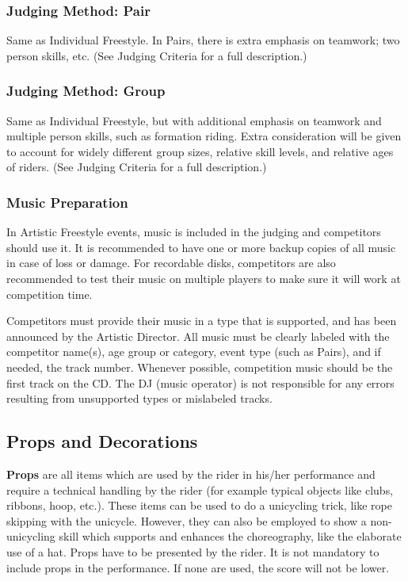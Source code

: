 \subsubsection{Judging Method: Pair}
Same as Individual Freestyle.
In Pairs, there is extra emphasis on teamwork; two person skills, etc.
(See Judging Criteria for a full description.)

\subsubsection{Judging Method: Group}
Same as Individual Freestyle, but with additional emphasis on teamwork and multiple person skills, such as formation riding.
Extra consideration will be given to account for widely different group sizes, relative skill levels, and relative ages of riders.
(See Judging Criteria for a full description.)

\subsubsection{Music Preparation}
\label{sec:freestyle_music}
In Artistic Freestyle events, music is included in the judging and competitors should use it.
It is recommended to have one or more backup copies of all music in case of loss or damage.
For recordable disks, competitors are also recommended to test their music on multiple players to make sure it will work at competition time.

Competitors must provide their music in a type that is supported, and has been announced by the Artistic Director.
All music must be clearly labeled with the competitor name(s), age group or category, event type (such as Pairs), and if needed, the track number.
Whenever possible, competition music should be the first track on the CD.
The DJ (music operator) is not responsible for any errors resulting from unsupported types or mislabeled tracks.

\subsection{Props and Decorations \label{subsec:freestyle_freestyle-rules_individual-freestyle-overview_props-and-decorations}}

\textbf{Props} are all items which are used by the rider in his/her performance and require a technical handling by the rider (for example typical objects like clubs, ribbons, hoop, etc.).
These items can be used to do a unicycling trick, like rope skipping with the unicycle.
However, they can also be employed to show a non-unicycling skill which supports and enhances the choreography, like the elaborate use of a hat.
Props have to be presented by the rider.
It is not mandatory to include props in the performance.
If none are used, the score will not be lower.

